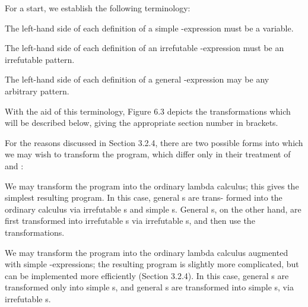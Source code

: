 {For a start, we establish the following terminology:
\begin{numbered}
	\item The left-hand side of each definition of a simple -expression must
	be a variable.
	\item The left-hand side of each definition of an irrefutable -expression
	must be an irrefutable pattern.
	\item The left-hand side of each definition of a general -expression may
	be any arbitrary pattern.
\end{numbered}
With the aid of this terminology, Figure 6.3 depicts the transformations which
will be described below, giving the appropriate section number in brackets.

For the reasons discussed in Section 3.2.4, there are two possible forms into
which we may wish to transform the program, which differ only in their
treatment of  and :
\begin{numbered}
	\item We may transform the program into the ordinary lambda calculus; this
	gives the simplest resulting program. In this case, general s are trans-
	formed into the ordinary calculus via irrefutable s and simple s.
	General s, on the other hand, are first transformed into irrefutable
	s via irrefutable s, and then use the  transformations.
	\item We may transform the program into the ordinary lambda calculus
	augmented with simple -expressions; the resulting program is
	slightly more complicated, but can be implemented more efficiently
	(Section 3.2.4). In this case, general s are transformed only into simple
	s, and general s are transformed into simple s, via irrefutable
	s.
\end{numbered}

\begin{figure}[H]
	\centering
	
\end{figure}}
